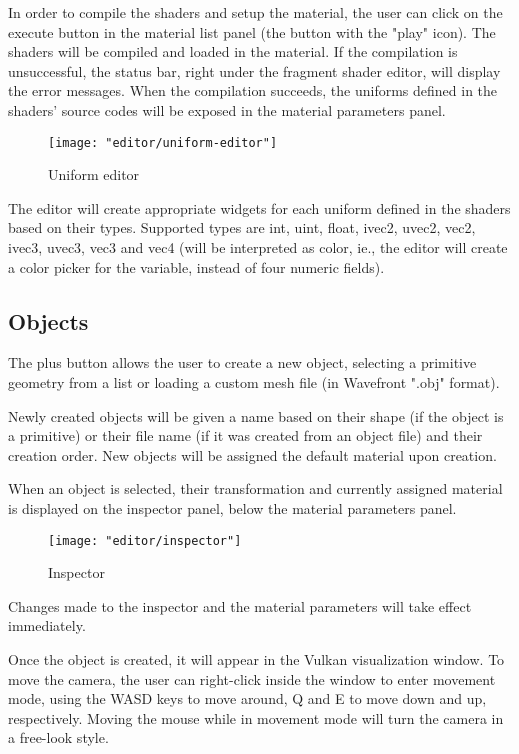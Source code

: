 In order to compile the shaders and setup the material, the user can click on the execute button in the material list panel (the button with the "play" icon). The shaders will be compiled and loaded in the material. If the compilation is unsuccessful, the status bar, right under the fragment shader editor, will display the error messages. When the compilation succeeds, the uniforms defined in the shaders' source codes will be exposed in the material parameters panel.

\begin{figure}
    \centering
    \caption{Uniform editor}
    \texttt{[image: "editor/uniform-editor"]}
    \label{fig:uniform-editor}
\end{figure}

The editor will create appropriate widgets for each uniform defined in the shaders based on their types. Supported types are int, uint, float, ivec2, uvec2, vec2, ivec3, uvec3, vec3 and vec4 (will be interpreted as color, ie., the editor will create a color picker for the variable, instead of four numeric fields).

\subsection{Objects}

The plus button allows the user to create a new object, selecting a primitive geometry from a list or loading a custom mesh file (in Wavefront ".obj" format).

Newly created objects will be given a name based on their shape (if the object is a primitive) or their file name (if it was created from an object file) and their creation order. New objects will be assigned the default material upon creation.

When an object is selected, their transformation and currently assigned material is displayed on the inspector panel, below the material parameters panel.

\begin{figure}
    \centering
    \caption{Inspector}
    \texttt{[image: "editor/inspector"]}
    \label{fig:inspector}
\end{figure}

Changes made to the inspector and the material parameters will take effect immediately.

Once the object is created, it will appear in the Vulkan visualization window. To move the camera, the user can right-click inside the window to enter movement mode, using the WASD keys to move around, Q and E to move down and up, respectively. Moving the mouse while in movement mode will turn the camera in a free-look style.
